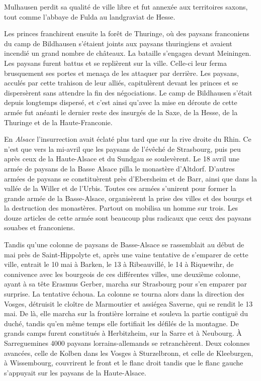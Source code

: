 \documentclass[french,twoside]{book} %
\begin{document}
Mulhausen perdit sa qualité de ville libre et fut annexée aux territoires saxons, tout comme l’abbaye de Fulda au landgraviat de Hesse.\par
Les princes franchirent ensuite la forêt de Thuringe, où des paysans franconiens du camp de Bildhausen s’étaient joints aux paysans thuringiens et avaient incendié un grand nombre de châteaux. La bataille s’engagea devant Meiningen. Les paysans furent battus et se replièrent sur la ville. Celle-ci leur ferma brusquement ses portes et menaça de les attaquer par derrière. Les paysans, acculés par cette trahison de leur alliés, capitulèrent devant les princes et se dispersèrent sans attendre la fin des négociations. Le camp de Bildhausen s’était depuis longtemps dispersé, et c’est ainsi qu’avec la mise en déroute de cette armée fut anéanti le dernier reste des insurgés de la Saxe, de la Hesse, de la Thuringe et de la Haute-Franconie.\par
En \emph{Alsace} l’insurrection avait éclaté plus tard que sur la rive droite du Rhin. Ce n’est que vers la mi-avril que les paysans de l’évêché de Strasbourg, puis peu après ceux de la Haute-Alsace et du Sundgau se soulevèrent. Le 18 avril une armée de paysans de la Basse Alsace pilla le monastère d’Altdorf. D’autres armées de paysans se constituèrent près d’Ebersheim et de Barr, ainsi que dans la vallée de la Willer et de l’Urbis. Toutes ces armées s’unirent pour former la grande armée de la Basse-Alsace, organisèrent la prise des villes et des bourgs et la destruction des monastères. Partout on mobilisa un homme sur trois. Les douze articles de cette armée sont beaucoup plus radicaux que ceux des paysans souabes et franconiens.\par
Tandis qu’une colonne de paysans de Basse-Alsace se rassemblait au début de mai près de Saint-Hippolyte et, après une vaine tentative de s’emparer de cette ville, entrait le 10 mai à Barken, le 13 à Ribeauvillé, le 14 à Riquewihr, de connivence avec les bourgeois de ces différentes villes, une deuxième colonne, ayant à sa tête Erasmus Gerber, marcha sur Strasbourg pour s’en emparer par surprise. La tentative échoua. La colonne se tourna alors dans la direction des Vosges, détruisit le cloître de Marmoutier et assiégea Saverne, qui se rendit le 13 mai. De là, elle marcha sur la frontière lorraine et souleva la partie contiguë du duché, tandis qu’en même temps elle fortifiait les défilés de la montagne. De grands camps furent constitués à Herbitzheim, sur la Sarre et à Neubourg. À Sarreguemines 4000 paysans lorrains-allemands se retranchèrent. Deux colonnes avancées, celle de Kolben dans les Vosges à Sturzelbronn, et celle de Kleeburgen, à Wissembourg, couvrirent le front et le flanc droit tandis que le flanc gauche s’appuyait sur les paysans de la Haute-Alsace.\par
\end{document}
